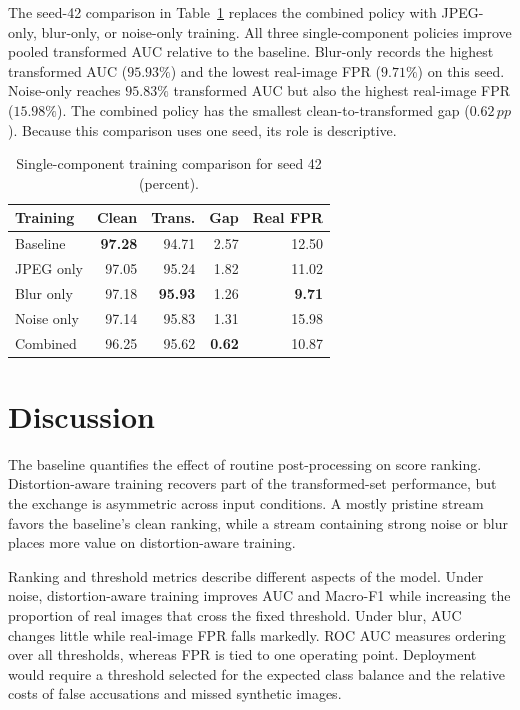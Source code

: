 \documentclass[conference]{IEEEtran}
\newcommand{\pp}{\,pp}
\begin{document}
The seed-42 comparison in Table~\ref{tab:ablation} replaces the combined
policy with JPEG-only, blur-only, or noise-only training. All three
single-component policies improve pooled transformed AUC relative to the
baseline. Blur-only records the highest transformed AUC ($95.93\%$) and the
lowest real-image FPR ($9.71\%$) on this seed. Noise-only reaches $95.83\%$
transformed AUC but also the highest real-image FPR ($15.98\%$). The combined
policy has the smallest clean-to-transformed gap ($0.62\pp$). Because this
comparison uses one seed, its role is descriptive.

\begin{table}[!t]
\centering
\caption{Single-component training comparison for seed 42 (percent).}
\label{tab:ablation}
\setlength{\tabcolsep}{3.2pt}
\begin{tabular}{lrrrr}
\toprule
Training & Clean & Trans. & Gap & Real FPR \\
\midrule
Baseline & \textbf{97.28} & 94.71 & 2.57 & 12.50 \\
JPEG only & 97.05 & 95.24 & 1.82 & 11.02 \\
Blur only & 97.18 & \textbf{95.93} & 1.26 & \textbf{9.71} \\
Noise only & 97.14 & 95.83 & 1.31 & 15.98 \\
Combined & 96.25 & 95.62 & \textbf{0.62} & 10.87 \\
\bottomrule
\end{tabular}
\end{table}

\section{Discussion}
\label{sec:discussion}

The baseline quantifies the effect of routine post-processing on score
ranking. Distortion-aware training recovers part of the transformed-set
performance, but the exchange is asymmetric across input conditions. A mostly
pristine stream favors the baseline's clean ranking, while a stream containing
strong noise or blur places more value on distortion-aware training.

Ranking and threshold metrics describe different aspects of the model. Under
noise, distortion-aware training improves AUC and Macro-F1 while increasing
the proportion of real images that cross the fixed threshold. Under blur, AUC
changes little while real-image FPR falls markedly. ROC AUC measures ordering
over all thresholds, whereas FPR is tied to one operating point. Deployment
would require a threshold selected for the expected class balance and the
relative costs of false accusations and missed synthetic images.
\end{document}
